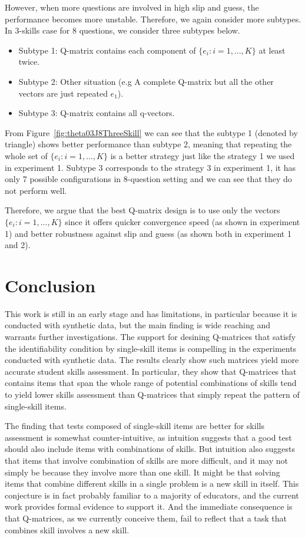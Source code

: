 \documentclass{edm_template}
\begin{document}
However, when more questions are involved in high slip and guess, the performance becomes more unstable. Therefore, we again consider more subtypes. In 3-skills case for 8 questions, we consider three subtypes below. 
\begin{itemize}
\item Subtype 1: Q-matrix contains each component of $\{e_{i}:i=1,...,K\}$ at least twice. 
\item Subtype 2: Other situation (e.g A complete Q-matrix but all the other vectors are just repeated $e_1$).
\item Subtype 3: Q-matrix contains all q-vectors.
\end{itemize}
From Figure~\ref{fig:theta03J8ThreeSkill} we can see that the subtype 1 (denoted by triangle) shows better performance than subtype 2, meaning that repeating the whole set of $\{e_{i}:i=1,...,K\}$ is a better strategy just like the strategy 1 we used in experiment 1. Subtype 3 corresponds to the strategy 3 in experiment 1, it has only 7 possible configurations in 8-question setting and we can see that they do not perform well.

Therefore, we argue that the best Q-matrix design is to use only the vectors $\{e_{i}:i=1,...,K\}$ since it offers quicker convergence speed (as shown in experiment 1) and better robustness against slip and guess (as shown both in experiment 1 and 2).

\section{Conclusion}

This work is still in an early stage and has limitations, in particular because it is conducted with synthetic data, but the main finding is wide reaching and warrants further investigations.  The support for desining Q-matrices that satisfy the identifiability condition by single-skill items is compelling in the experiments conducted with synthetic data.  The results clearly show such matrices yield more accurate student skills assessment. In particular, they show that Q-matrices that contains items that span the whole range of potential combinations of skills tend to yield lower skills assessment than Q-matrices that simply repeat the pattern of single-skill items.

The finding that tests composed of single-skill items are better for skills assessment is somewhat counter-intuitive, as intuition suggests that a good test should also include items with combinations of skills.  But intuition also suggests that items that involve combination of skills are more difficult, and it may not simply be because they involve more than one skill.  It might be that solving items that combine different skills in a single problem is a new skill in itself.  This conjecture is in fact probably familiar to a majority of educators, and the current work provides formal evidence to support it.  And the immediate consequence is that Q-matrices, as we currently conceive them, fail to reflect that a task that combines skill involves a new skill.
\end{document}
